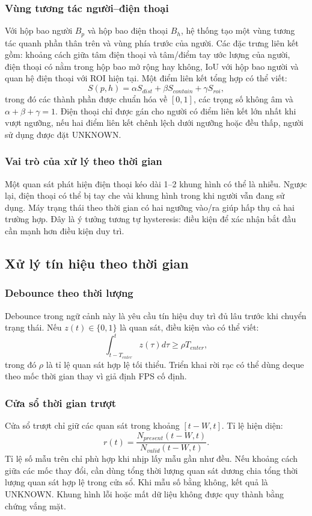 \subsubsection{Vùng tương tác người--điện thoại}
Với hộp bao người $B_p$ và hộp bao điện thoại $B_h$, hệ thống tạo một vùng tương tác quanh phần thân trên và vùng phía trước của người. Các đặc trưng liên kết gồm: khoảng cách giữa tâm điện thoại và tâm/điểm tay ước lượng của người, điện thoại có nằm trong hộp bao mở rộng hay không, IoU với hộp bao người và quan hệ điện thoại với ROI hiện tại. Một điểm liên kết tổng hợp có thể viết:
\begin{equation}
 S(p,h)=\alpha S_{dist}+\beta S_{contain}+\gamma S_{roi},
 \label{eq:phoneassoc}
\end{equation}
trong đó các thành phần được chuẩn hóa về $[0,1]$, các trọng số không âm và $\alpha+\beta+\gamma=1$. Điện thoại chỉ được gán cho người có điểm liên kết lớn nhất khi vượt ngưỡng, nếu hai điểm liên kết chênh lệch dưới ngưỡng hoặc đều thấp, người sử dụng được đặt UNKNOWN.

\subsubsection{Vai trò của xử lý theo thời gian}
Một quan sát phát hiện điện thoại kéo dài 1--2 khung hình có thể là nhiễu. Ngược lại, điện thoại có thể bị tay che vài khung hình trong khi người vẫn đang sử dụng. Máy trạng thái theo thời gian có hai ngưỡng vào/ra giúp hấp thụ cả hai trường hợp. Đây là ý tưởng tương tự hysteresis: điều kiện để xác nhận bắt đầu cần mạnh hơn điều kiện duy trì.

\subsection{Xử lý tín hiệu theo thời gian}
\subsubsection{Debounce theo thời lượng}
Debounce trong ngữ cảnh này là yêu cầu tín hiệu duy trì đủ lâu trước khi chuyển trạng thái. Nếu $z(t)\in\{0,1\}$ là quan sát, điều kiện vào có thể viết:
\begin{equation}
 \int_{t-T_{enter}}^t z(\tau)d\tau \geq \rho T_{enter},
\end{equation}
trong đó $\rho$ là tỉ lệ quan sát hợp lệ tối thiểu. Triển khai rời rạc có thể dùng deque theo mốc thời gian thay vì giả định FPS cố định.

\subsubsection{Cửa sổ thời gian trượt}
Cửa sổ trượt chỉ giữ các quan sát trong khoảng $[t-W,t]$. Tỉ lệ hiện diện:
\begin{equation}
 r(t)=\frac{N_{present}(t-W,t)}{N_{valid}(t-W,t)}.
\end{equation}
Tỉ lệ số mẫu trên chỉ phù hợp khi nhịp lấy mẫu gần như đều. Nếu khoảng cách giữa các mốc thay đổi, cần dùng tổng thời lượng quan sát dương chia tổng thời lượng quan sát hợp lệ trong cửa sổ. Khi mẫu số bằng không, kết quả là UNKNOWN. Khung hình lỗi hoặc mất dữ liệu không được quy thành bằng chứng vắng mặt.

